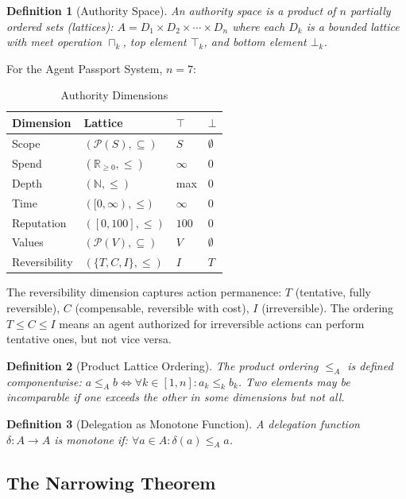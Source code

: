 \documentclass[sigconf,nonacm]{acmart}
\newtheorem{definition}{Definition}
\begin{document}
\begin{definition}[Authority Space]
An authority space is a product of $n$ partially ordered sets (lattices):
$A = D_1 \times D_2 \times \cdots \times D_n$
where each $D_k$ is a bounded lattice with meet operation $\sqcap_k$,
top element $\top_k$, and bottom element $\bot_k$.
\end{definition}

For the Agent Passport System, $n = 7$:

\begin{table}[h]
\caption{Authority Dimensions}
\label{tab:dimensions}
\begin{tabular}{@{}llll@{}}
\toprule
Dimension & Lattice & $\top$ & $\bot$ \\
\midrule
Scope & $(\mathcal{P}(S), \subseteq)$ & $S$ & $\emptyset$ \\
Spend & $(\mathbb{R}_{\geq 0}, \leq)$ & $\infty$ & $0$ \\
Depth & $(\mathbb{N}, \leq)$ & max & $0$ \\
Time & $([0,\infty), \leq)$ & $\infty$ & $0$ \\
Reputation & $([0,100], \leq)$ & $100$ & $0$ \\
Values & $(\mathcal{P}(V), \subseteq)$ & $V$ & $\emptyset$ \\
Reversibility & $(\{T,C,I\}, \leq)$ & $I$ & $T$ \\
\bottomrule
\end{tabular}
\end{table}

The reversibility dimension captures action permanence: $T$ (tentative, fully reversible),
$C$ (compensable, reversible with cost), $I$ (irreversible). The ordering $T \leq C \leq I$
means an agent authorized for irreversible actions can perform tentative ones, but not
vice versa.

\begin{definition}[Product Lattice Ordering]
The product ordering $\leq_A$ is defined componentwise:
$a \leq_A b \iff \forall k \in [1,n]: a_k \leq_k b_k$.
Two elements may be incomparable if one exceeds the other in some dimensions but not all.
\end{definition}

\begin{definition}[Delegation as Monotone Function]
A delegation function $\delta: A \to A$ is monotone if:
$\forall a \in A: \delta(a) \leq_A a$.
\end{definition}

\subsection{The Narrowing Theorem}
\end{document}
